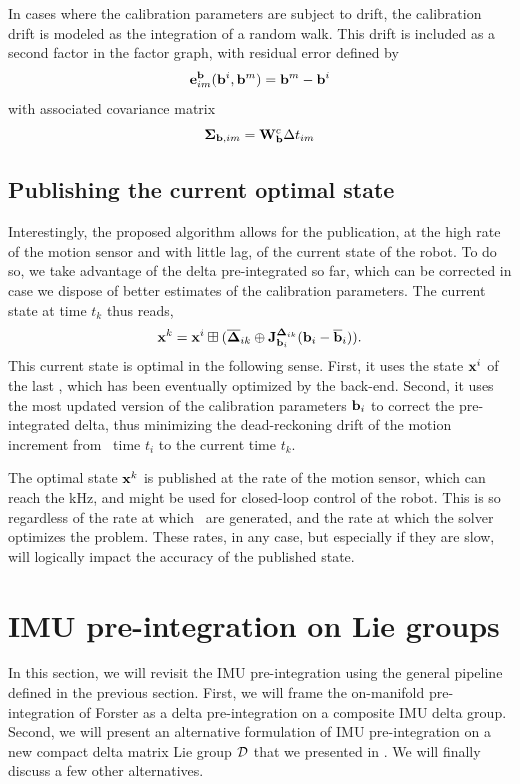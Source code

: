 In cases where the calibration parameters are subject to drift, the calibration drift is modeled as the integration of a random walk. This drift is included as a second factor 
in the factor graph, with residual error defined by
%
\begin{equation}
    {\bf e}^{{\bf b}}_{im}({\bf b}^i, {\bf b}^m) = {\bf b}^m - {\bf b}^i
\end{equation}
%
with associated covariance matrix
%
\begin{equation}
    {\bm \Sigma}_{{\bf b},im} = {\bf W}^c_{{\bf b}} \Delta t_{im}
\end{equation}


\subsection{Publishing the current optimal state}
\label{sec:publish-state}

Interestingly, the proposed algorithm allows for the publication, at the high rate of the motion sensor and with little lag, of the current state of the robot. 
To do so, we take advantage of the delta pre-integrated so far, which can be corrected in case we dispose of better estimates of the calibration parameters. 
The current state at time $t_k$ thus reads,
%
\begin{align}
    {\bf x}^k = {\bf x}^i \boxplus (\overline{{{\bm \Delta}}}_{ik} \oplus {\bf J}^{{{\bm \Delta}}_{ik}}_{{\bf b}_i} ({\bf b}_i - \overline{{\bf b}}_i)).
\end{align}
%
This current state is optimal in the following sense. First, it uses the state ${\bf x}^i$ of the last \keyframe, which has been eventually optimized by the back-end. 
Second, it uses the most updated version of the calibration parameters ${\bf b}_i$ to correct the pre-integrated delta, thus minimizing the dead-reckoning drift of the motion 
increment from \keyframe\ time $t_i$ to the current time $t_k$.

The optimal state ${\bf x}^k$ is published at the rate of the motion sensor, which can reach the kHz, and might be used for closed-loop control of the robot. 
This is so regardless of the rate at which \keyframes\ are generated, and the rate at which the solver optimizes the problem. These rates, in any case, but especially 
if they are slow, will logically impact the accuracy of the published state.

%
%
%
%
\section{IMU pre-integration on Lie groups}
In this section, we will revisit the IMU pre-integration using the general pipeline defined in the previous section. First, we will frame the on-manifold pre-integration
of Forster \cite{forster2015imu, forster2017-TRO} as a delta pre-integration on a composite IMU delta group.
Second, we will present an alternative formulation of IMU pre-integration on a new compact delta matrix Lie group $\mathcal{D}$ that we presented in \cite{fourmy2019absolute}.
We will finally discuss a few other alternatives.


